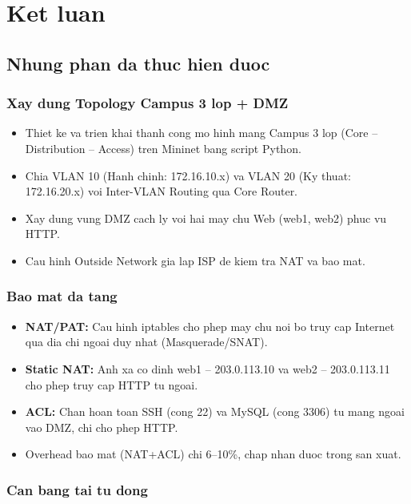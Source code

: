 \chapter{Ket luan}

\section{Nhung phan da thuc hien duoc}

\subsection{Xay dung Topology Campus 3 lop + DMZ}

\begin{itemize}
    \item Thiet ke va trien khai thanh cong mo hinh mang Campus 3 lop (Core -- Distribution -- Access) tren Mininet bang script Python.
    \item Chia VLAN 10 (Hanh chinh: 172.16.10.x) va VLAN 20 (Ky thuat: 172.16.20.x) voi Inter-VLAN Routing qua Core Router.
    \item Xay dung vung DMZ cach ly voi hai may chu Web (web1, web2) phuc vu HTTP.
    \item Cau hinh Outside Network gia lap ISP de kiem tra NAT va bao mat.
\end{itemize}

\subsection{Bao mat da tang}

\begin{itemize}
    \item \textbf{NAT/PAT:} Cau hinh iptables cho phep may chu noi bo truy cap Internet qua dia chi ngoai duy nhat (Masquerade/SNAT).
    \item \textbf{Static NAT:} Anh xa co dinh web1 -- 203.0.113.10 va web2 -- 203.0.113.11 cho phep truy cap HTTP tu ngoai.
    \item \textbf{ACL:} Chan hoan toan SSH (cong 22) va MySQL (cong 3306) tu mang ngoai vao DMZ, chi cho phep HTTP.
    \item Overhead bao mat (NAT+ACL) chi 6--10\%, chap nhan duoc trong san xuat.
\end{itemize}

\subsection{Can bang tai tu dong}

